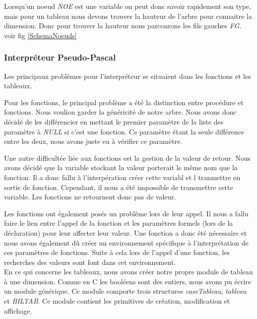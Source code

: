 \documentclass[10pt,a4paper]{article}
\begin{document}
Lorsqu'un noeud \textit{NOE} est une variable on peut donc savoir rapidement son type, mais pour un tableau nous devons trouver la hauteur de l'arbre pour connaitre la dimension. Donc pour trouver la hauteur nous parcourons les fils gauches \textit{FG}. voir fig \ref{SchemaNoeuds}


\subsubsection{Interpréteur Pseudo-Pascal}

Les principaux problèmes pour l'interpréteur se situaient dans les fonctions et les tableaux.

Pour les fonctions, le principal problème a été la distinction entre procédure et fonctions. Nous voulion garder la généricité de notre arbre. Nous avons donc décidé de les différencier en mettant le premier paramètre de la liste des paramètre à \textit{NULL} si c'est une fonction. Ce paramètre étant la seule différence entre les deux,  nous avons juste eu à vérifier ce paramètre.

Une autre difficultée liée aux fonctions est la gestion de la valeur de retour. Nous avons décidé que la variable stockant la valeur porterait le même nom que la fonction. Il a donc fallu à l'interpération créer cette variabl et l tranmettre en sortie de fonction. Cependant, il nous a été impossible de transmettre cette variable. Les fonctions ne retournent donc pas de valeur.

Les fonctions ont également posés un problème lors de leur appel. Il nous a fallu faire le lien entre l'appel de la fonction et les paramètres formels (lors de la déclaration) pour leur affecter leur valeur. Une fonction a donc été nécessaire et nous avons également dû créer un environnement spécifique à l'interprétation de ces paramètres de fonctions. Suite à cela lors de l'appel d'une fonction, les recherches des valeurs sont font dans cet environnement.\\

En ce qui concerne les tableaux, nous avons créer notre propre module de tableau à une dimension. Comme en C les booléens sont des entiers, nous avons pu écrire un module générique. Ce module comporte trois structures \textit{caseTableau}, \textit{tableau} et \textit{BILTAB}.
Ce module contient les primitives de création, modification et affichage.\\
\end{document}
